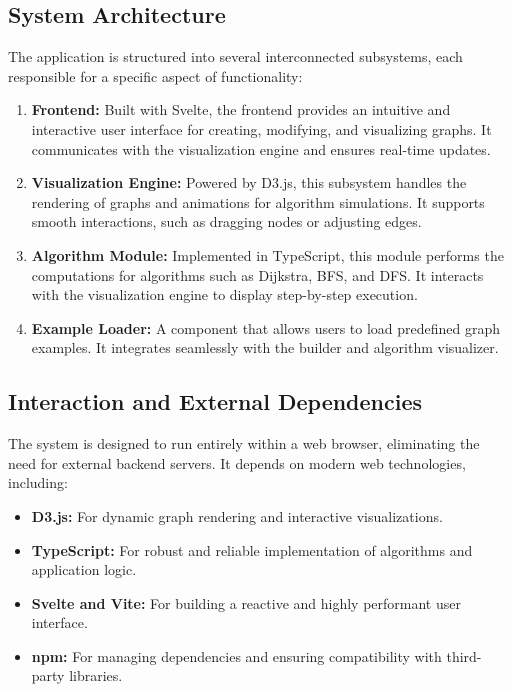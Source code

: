 \subsection{System Architecture}
The application is structured into several interconnected subsystems, each responsible for a specific aspect of functionality:
\begin{enumerate}
    \item \textbf{Frontend:} Built with Svelte, the frontend provides an intuitive and interactive user interface for creating, modifying, and visualizing graphs. It communicates with the visualization engine and ensures real-time updates.
    \item \textbf{Visualization Engine:} Powered by D3.js, this subsystem handles the rendering of graphs and animations for algorithm simulations. It supports smooth interactions, such as dragging nodes or adjusting edges.
    \item \textbf{Algorithm Module:} Implemented in TypeScript, this module performs the computations for algorithms such as Dijkstra, BFS, and DFS. It interacts with the visualization engine to display step-by-step execution.
    \item \textbf{Example Loader:} A component that allows users to load predefined graph examples. It integrates seamlessly with the builder and algorithm visualizer.
\end{enumerate}

\subsection{Interaction and External Dependencies}
The system is designed to run entirely within a web browser, eliminating the need for external backend servers. It depends on modern web technologies, including:
\begin{itemize}
    \item \textbf{D3.js:} For dynamic graph rendering and interactive visualizations.
    \item \textbf{TypeScript:} For robust and reliable implementation of algorithms and application logic.
    \item \textbf{Svelte and Vite:} For building a reactive and highly performant user interface.
    \item \textbf{npm:} For managing dependencies and ensuring compatibility with third-party libraries.
\end{itemize}


